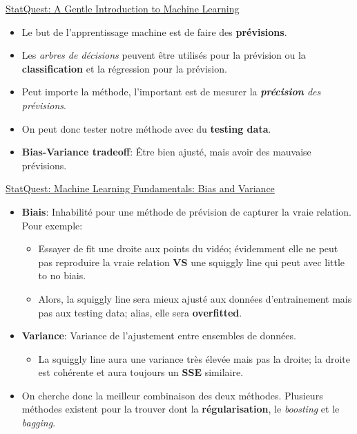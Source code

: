 \documentclass[12pt, titlepage, french]{report}
\begin{document}
\begin{YTB_SUMM}[label = {SQ-BASICS-ML-INTRO}]{\href{https://www.youtube.com/watch?v=Gv9_4yMHFhI&list=PLblh5JKOoLUICTaGLRoHQDuF_7q2GfuJF&index=2&t=0s}{StatQuest: A Gentle Introduction to Machine Learning}}
\begin{itemize}
	\item	Le but de l'apprentissage machine est de faire des \textbf{prévisions}. 
	\item	Les \textit{arbres de décisions} peuvent être utilisés pour la prévision ou la \textbf{classification} et la régression pour la prévision.
	\item	Peut importe la méthode, l'important est de mesurer la \textit{\textbf{précision} des prévisions}.
	\item	On peut donc tester notre méthode avec du \textbf{testing data}.
	\item	\textbf{Bias-Variance tradeoff}: Être bien ajusté, mais avoir des mauvaise prévisions.
\end{itemize}
\end{YTB_SUMM}

\begin{YTB_SUMM}[label = {SQ-BASICS-ML-BIASVARIANCE}]{\href{https://www.youtube.com/watch?v=EuBBz3bI-aA&list=PLblh5JKOoLUICTaGLRoHQDuF_7q2GfuJF&index=6}{StatQuest: Machine Learning Fundamentals: Bias and Variance}}
\begin{itemize}
	\item	\textbf{Biais}: Inhabilité pour une méthode de prévision de capturer la vraie relation. Pour exemple:
	\begin{itemize}
		\item	Essayer de fit une droite aux points du vidéo; évidemment elle ne peut pas reproduire la vraie relation \textbf{VS} une squiggly line qui peut avec little to no biais.
		\item	Alors, la squiggly line sera mieux ajusté aux données d'entrainement mais pas aux testing data; alias, elle sera \textbf{overfitted}.
	\end{itemize}
	\item	\textbf{Variance}: Variance de l'ajustement entre ensembles de données.
	\begin{itemize}
		\item	La squiggly line aura une variance très élevée mais pas la droite; la droite est cohérente et aura toujours un \textbf{SSE} similaire.
	\end{itemize}
	\item	On cherche donc la meilleur combinaison des deux méthodes. Plusieurs méthodes existent pour la trouver dont la \textbf{régularisation}, le \textit{boosting} et le \textit{bagging}.
\end{itemize}
\end{YTB_SUMM}
\end{document}
